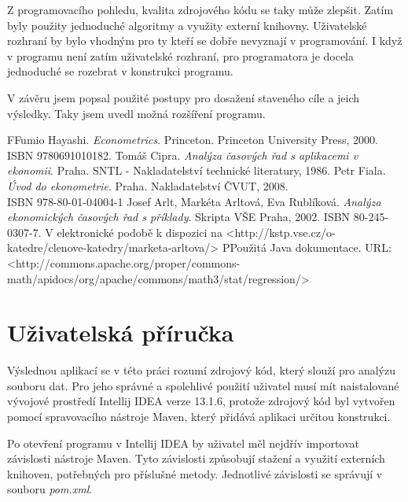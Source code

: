 \documentclass[a4paper,12pt,twoside]{scrreprt}
\begin{document}
Z programovacího pohledu, kvalita zdrojového kódu se taky může zlepšit. Zatím byly použity jednoduché algoritmy a využity externí knihovny. Uživatelské rozhraní by bylo vhodným pro ty kteří se dobře nevyznají v programování. I když v programu není zatím uživatelské rozhraní, pro programatora je docela jednoduché se rozebrat v konstrukci programu. 

V závěru jsem popsal použité postupy pro dosažení staveného cíle a jeich výsledky. Taky jsem uvedl možná rozšíření programu. 

\clearpage
{} %
\begin{thebibliography}{99}   
	\bibitem FFumio Hayashi. \emph{Econometrics}. Princeton. Princeton University Press, 2000. ISBN 9780691010182.
	 Tomáš Cipra. \emph{Analýza časových řad s aplikacemi v ekonomii}. Praha. SNTL - Nakladatelství technické literatury, 1986.
	 Petr Fiala. \emph{Úvod do ekonometrie}. Praha. Nakladatelství ČVUT, 2008. \\ ISBN 978-80-01-04004-1
	 Josef Arlt, Markéta Arltová, Eva Rublíková. \emph{Analýza ekonomických časových řad s příklady}. Skripta VŠE Praha, 2002. ISBN 80-245-0307-7. V elektronické podobě k dispozici na <http://kstp.vse.cz/o-katedre/clenove-katedry/marketa-arltova/>
	\bibitem PPoužitá Java dokumentace. URL: <http://commons.apache.org/proper/commons-math/apidocs/org/apache/commons/math3/stat/regression/> 	
	
\end{thebibliography}

\newpage %
\appendix %

\chapter{Uživatelská příručka} %

Výslednou aplikací se v této práci rozumí zdrojový kód, který slouží pro analýzu souboru dat. Pro jeho správné a spolehlivé použití uživatel musí mít naistalované vývojové prostředí Intellij IDEA verze 13.1.6, protože zdrojový kód byl vytvořen pomocí spravovacího nástroje Maven, který přidává aplikaci určitou konstrukci. 

Po otevření programu v Intellij IDEA by uživatel měl nejdřív importovat závislosti nástroje Maven. Tyto závislosti způsobují stažení a využití externích knihoven, potřebných pro příslušné metody. Jednotlivé závislosti se správují v souboru \textit{pom.xml}. 
\end{document}
